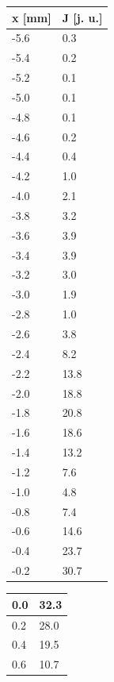 \documentclass{fizykalab}
\begin{document}
{\begin{figure}[htp]
\begin{minipage}[t]{0.5\textwidth}
		\begin{minipage}[t]{0.5\textwidth}
			\begin{tabular}{|p{3.5em}|p{3.5em}|}
				\hline
				\textbf{x [mm]} & \textbf{J [j. u.]} \\ \hline\hline
				-5.6 & 0.3 \\ \hline
				-5.4 & 0.2 \\ \hline
				-5.2 & 0.1 \\ \hline
				-5.0 & 0.1 \\ \hline
				-4.8 & 0.1 \\ \hline
				-4.6 & 0.2 \\ \hline
				-4.4 & 0.4 \\ \hline
				-4.2 & 1.0 \\ \hline
				-4.0 & 2.1 \\ \hline
				-3.8 & 3.2 \\ \hline
				-3.6 & 3.9 \\ \hline
				-3.4 & 3.9 \\ \hline
				-3.2 & 3.0 \\ \hline
				-3.0 & 1.9 \\ \hline
				-2.8 & 1.0 \\ \hline
				-2.6 & 3.8 \\ \hline
				-2.4 & 8.2 \\ \hline
				-2.2 & 13.8 \\ \hline
				-2.0 & 18.8 \\ \hline
				-1.8 & 20.8 \\ \hline
				-1.6 & 18.6 \\ \hline
				-1.4 & 13.2 \\ \hline
				-1.2 & 7.6 \\ \hline
				-1.0 & 4.8 \\ \hline
				-0.8 & 7.4 \\ \hline
				-0.6 & 14.6 \\ \hline
				-0.4 & 23.7 \\ \hline
				-0.2 & 30.7 \\ \hline
			\end{tabular}
		\end{minipage}%
		\hfill
		\begin{minipage}[t]{0.5\textwidth}
			\begin{tabular}{|p{3.5em}|p{3.5em}|}
				\hline
				0.0 & 32.3 \\ \hline
				0.2 & 28.0 \\ \hline
				0.4 & 19.5 \\ \hline
				0.6 & 10.7 \\ \hline

\end{tabular}
\end{minipage}
\end{minipage}
\end{figure}}
\end{document}
